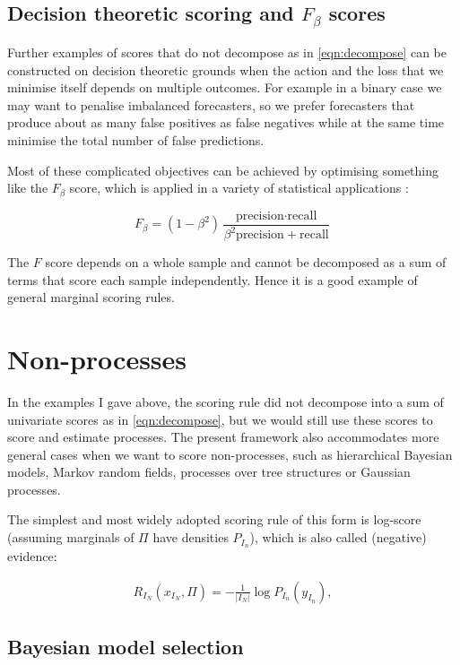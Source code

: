 \subsection{Decision theoretic scoring and $F_{\beta}$ scores}

Further examples of scores that do not decompose as in \eqref{eqn:decompose} can be constructed on decision theoretic grounds when the action and the loss that we minimise itself depends on multiple outcomes. For example in a binary case we may want to penalise imbalanced forecasters, so we prefer forecasters that produce about as many false positives as false negatives while at the same time minimise the total number of false predictions.

Most of these complicated objectives can be achieved by optimising something like the $F_{\beta}$ score, which is applied in a variety of statistical applications \citep{}:

\begin{equation}
	F_\beta = (1-\beta^2)\frac{\mbox{precision}\cdot\mbox{recall}}{\beta^2 \mbox{precision} + \mbox{recall}}
\end{equation}

The $F$ score depends on a whole sample and cannot be decomposed as a sum of terms that score each sample independently. Hence it is a good example of general marginal scoring rules.

\section{Non-\iid processes}

In the examples I gave above, the scoring rule did not decompose into a sum of univariate scores as in \eqref{eqn:decompose}, but we would still use these scores to score and estimate \iid processes. The present framework also accommodates more general cases when we want to score non-\iid processes, such as hierarchical Bayesian models, Markov random fields, processes over tree structures or Gaussian processes.

The simplest and most widely adopted scoring rule of this form is log-score (assuming marginals of $\Pi$ have densities $P_{I_n}$), which is also called (negative) evidence:

\begin{align}
	R_{I_N}(x_{I_N},\Pi) = - \frac{1}{\vert I_N \vert}\log P_{I_n}(y_{I_n}),
\end{align}

\subsection{Bayesian model selection}

